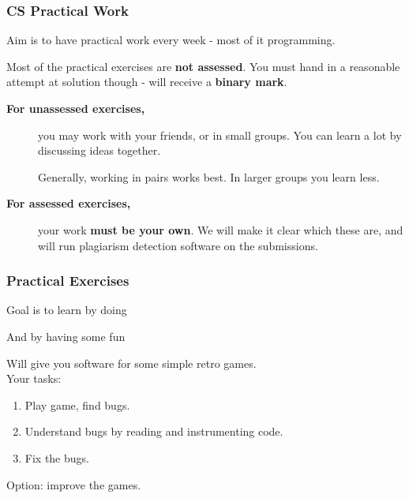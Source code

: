 \documentclass{beamer} %
\newcommand\emc[1]{\textcolor{midred}{\textbf{#1}}}
\begin{document}
\begin{frame}
  \frametitle{CS Practical Work}

  Aim is to have practical work every week - most of it programming.

\vspace{3mm}
  Most of the practical exercises are \emc{not assessed}.  You must hand in
  a reasonable attempt at solution though - will receive a \emc{binary
  mark}.

 \begin{description}
  \item[{\bf For unassessed exercises,}] you may work with your friends, or in
  small groups.  You can learn a lot by discussing ideas together.

  \vspace{3mm}
Generally, working in pairs works best.  In larger groups you learn
  less.

  \item[{\bf For assessed exercises,}] your work \emc{\bf must be your own}.  We will make
  it clear which these are, and will run plagiarism detection software
  on the submissions.
  \end{description}
\end{frame}

\begin{frame}
  \frametitle{Practical Exercises}

  Goal is to learn by doing

  \vspace{2mm}
  And by having some fun

  \vspace{2mm}
  Will give you software for some simple retro games.\\
  Your tasks:
  \begin{enumerate}
  \item Play game, find bugs.
  \item Understand bugs by reading and instrumenting code.
  \item Fix the bugs.
  \end{enumerate}
  Option: improve the games.
\end{frame}
\end{document}
